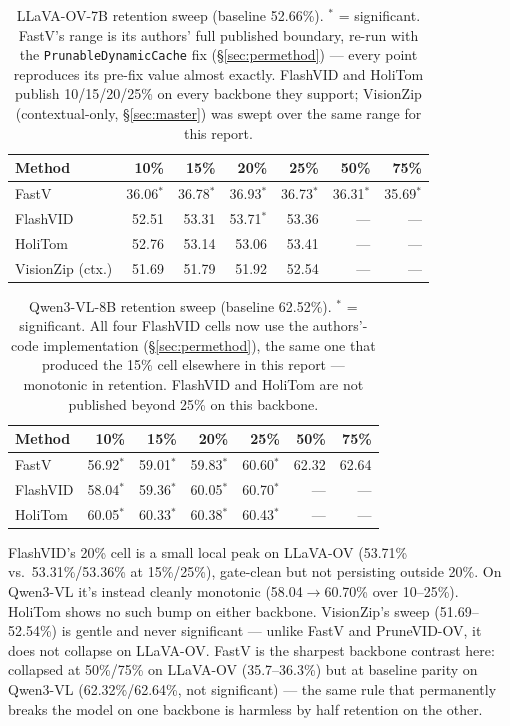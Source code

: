 \documentclass[11pt]{article}
\begin{document}
\begin{table}[H]
  \centering
  \small
  \caption{LLaVA-OV-7B retention sweep (baseline 52.66\%). $^{*}$ =
  significant. FastV's range is its authors' full published boundary,
  re-run with the \texttt{PrunableDynamicCache} fix (\S\ref{sec:permethod})
  --- every point reproduces its pre-fix value almost exactly. FlashVID and
  HoliTom publish 10/15/20/25\% on every backbone they support; VisionZip
  (contextual-only, \S\ref{sec:master}) was swept over the same range for
  this report.}
  \label{tab:sweepllava}
  \begin{tabular}{lrrrrrr}
    \toprule
    Method & 10\% & 15\% & 20\% & 25\% & 50\% & 75\% \\
    \midrule
    FastV & 36.06$^{*}$ & 36.78$^{*}$ & 36.93$^{*}$ & 36.73$^{*}$ & 36.31$^{*}$ & 35.69$^{*}$ \\
    FlashVID & 52.51 & 53.31 & 53.71$^{*}$ & 53.36 & --- & --- \\
    HoliTom & 52.76 & 53.14 & 53.06 & 53.41 & --- & --- \\
    VisionZip (ctx.) & 51.69 & 51.79 & 51.92 & 52.54 & --- & --- \\
    \bottomrule
  \end{tabular}
\end{table}

\begin{table}[H]
  \centering
  \small
  \caption{Qwen3-VL-8B retention sweep (baseline 62.52\%). $^{*}$ =
  significant. All four FlashVID cells now use the authors'-code
  implementation (\S\ref{sec:permethod}), the same one that produced the
  15\% cell elsewhere in this report --- monotonic in retention. FlashVID
  and HoliTom are not published beyond 25\% on this backbone.}
  \label{tab:sweepqwen}
  \begin{tabular}{lrrrrrr}
    \toprule
    Method & 10\% & 15\% & 20\% & 25\% & 50\% & 75\% \\
    \midrule
    FastV & 56.92$^{*}$ & 59.01$^{*}$ & 59.83$^{*}$ & 60.60$^{*}$ & 62.32 & 62.64 \\
    FlashVID & 58.04$^{*}$ & 59.36$^{*}$ & 60.05$^{*}$ & 60.70$^{*}$ & --- & --- \\
    HoliTom & 60.05$^{*}$ & 60.33$^{*}$ & 60.38$^{*}$ & 60.43$^{*}$ & --- & --- \\
    \bottomrule
  \end{tabular}
\end{table}

FlashVID's 20\% cell is a small local peak on LLaVA-OV (53.71\% vs.\
53.31\%/53.36\% at 15\%/25\%), gate-clean but not persisting outside 20\%.
On Qwen3-VL it's instead cleanly monotonic (58.04$\to$60.70\% over
10--25\%). HoliTom shows no such bump on either backbone. VisionZip's
sweep (51.69--52.54\%) is gentle and never significant --- unlike FastV
and PruneVID-OV, it does not collapse on LLaVA-OV. FastV is the sharpest
backbone contrast here: collapsed at 50\%/75\% on LLaVA-OV
(35.7--36.3\%) but at baseline parity on Qwen3-VL (62.32\%/62.64\%, not
significant) --- the same rule that permanently breaks the model on one
backbone is harmless by half retention on the other.
\end{document}
